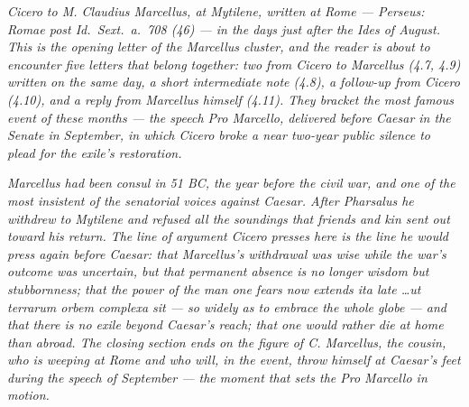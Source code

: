 
\textit{Cicero to M. Claudius Marcellus, at Mytilene, written at
Rome --- Perseus: \textit{Romae post Id.~Sext.~a.~708 (46)} --- in
the days just after the Ides of August. This is the opening
letter of the Marcellus cluster, and the reader is about to
encounter five letters that belong together: two from Cicero to
Marcellus (4.7, 4.9) written on the same day, a short
intermediate note (4.8), a follow-up from Cicero (4.10), and a
reply from Marcellus himself (4.11). They bracket the most famous
event of these months --- the speech \textit{Pro Marcello},
delivered before Caesar in the Senate in September, in which
Cicero broke a near two-year public silence to plead for the
exile's restoration.}

\textit{Marcellus had been consul in 51 BC, the year before the
civil war, and one of the most insistent of the senatorial voices
against Caesar. After Pharsalus he withdrew to Mytilene and
refused all the soundings that friends and kin sent out toward
his return. The line of argument Cicero presses here is the line
he would press again before Caesar: that Marcellus's withdrawal
was wise while the war's outcome was uncertain, but that
permanent absence is no longer wisdom but stubbornness; that the
power of the man one fears now extends \textit{ita late \dots ut
terrarum orbem complexa sit} --- so widely as to embrace the
whole globe --- and that there is no exile beyond Caesar's reach;
that one would rather die at home than abroad. The closing
section ends on the figure of C. Marcellus, the cousin, who is
weeping at Rome and who will, in the event, throw himself at
Caesar's feet during the speech of September --- the moment that
sets the \textit{Pro Marcello} in motion.}
